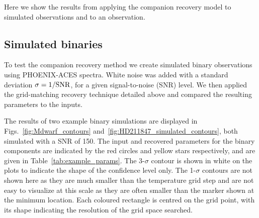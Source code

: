 \begin{figure*}
    \centering
    \caption{Similar to Fig.~\ref{fig:Mdwarf_contours}, \(\chi^2\) results for companion recovery of a simulated binary observation similar to {HD 211847}, (\(T_{\textrm{eff}_1} = 5800\)~K, \(T_{\textrm{eff}_2}=3200\)~K). The top right plot shows the application of a single component model (\(C^1\)) while the other three are using a binary model (\(C^2\)). Both left hand panels show the distribution of host temperature and host RV.\@ The top right panel shows the distribution for host and companion temperature, and the bottom right the companion temperature and radial velocity.
        The red circle and yellow star indicate the location of the simulation input and recovered parameters respectively.
        The white line shows a 3-\(\sigma\) confidence level about the minimum \(\chi^2\) solution grid point. Each box is centred on the parameter values and shows the grid resolution.}
    \label{fig:HD211847_simulated_contours}
\end{figure*}
Here we show the results from applying the companion recovery model to simulated observations and to an observation.


\subsection{Simulated binaries}
\label{subsec:simulated_binaries}
To test the companion recovery method we create simulated binary observations using PHOENIX-ACES spectra. White noise was added with a standard deviation \(\rm \sigma = 1/SNR\), for a given signal-to-noise (SNR) level. We then applied the grid-matching recovery technique detailed above and compared the resulting parameters to the inputs. 

The results of two example binary simulations are displayed in Figs.~\ref{fig:Mdwarf_contours} and~\ref{fig:HD211847_simulated_contours}, both simulated with a SNR of 150. The input and recovered parameters for the binary components are indicated by the red circles and yellow stars respectively, and are given in Table~\ref{tab:example_params}. 
The 3-\(\sigma\) contour is shown in white on the plots to indicate the shape of the confidence level only. The 1-\(\sigma\) contours are not shown here as they are much smaller than the temperature grid step and are not easy to visualize at this scale as they are often smaller than the marker shown at the minimum location. Each coloured rectangle is centred on the grid point, with its shape indicating the resolution of the grid space searched.

